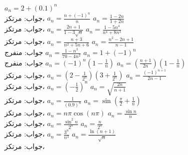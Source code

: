 $a_n=2+(0.1)^n$\\
جواب:\quad
مرتکز، 
$a_n=\frac{n+(-1)^n}{n}$
$a_n=\frac{1-2n}{1+2n}$\\
جواب:\quad
مرتکز، 
$a_n=\frac{2n+1}{1-3\sqrt{n}}$
$a_n=\frac{1-5n^4}{n^4+8n^3}$\\
جواب:\quad
مرتکز، 
$a_n=\frac{n+3}{n^2+5n+6}$
$a_n=\frac{n^2-2n+1}{n-1}$\\
جواب:\quad
منفرج
$a_n=\frac{1-n^3}{70-4n^2}$
$a_n=1+(-1)^n$\\
جواب:\quad
منفرج
$a_n=(-1)^n(1-\tfrac{1}{n})$
$a_n=(\tfrac{n+1}{2n})(1-\tfrac{1}{n})$\\
جواب:\quad
مرتکز، 
$a_n=(2-\tfrac{1}{2^n})(3+\tfrac{1}{2^n})$
$a_n=\frac{(-1)^{n+1}}{2n-1}$\\
جواب:\quad
مرتکز، 
$a_n=(-\tfrac{1}{2})^n$
$a_n=\sqrt{\frac{2n}{n+1}}$\\
جواب:\quad
مرتکز، 
$a_n=\frac{1}{(0.9)^n}$
$a_n=\sin(\tfrac{\pi}{2}+\tfrac{1}{n})$\\
جواب:\quad
مرتکز، 
$a_n=n\pi \cos (n\pi)$
$a_n=\frac{\sin n}{n}$\\
جواب:\quad
مرتکز، 
$a_n=\frac{\sin^2 n}{2^n}$
$a_n=\frac{n}{2^n}$\\
جواب:\quad
مرتکز، 
$a_n=\frac{3^n}{n^3}$
$a_n=\frac{\ln(n+1)}{\sqrt{n}}$\\
جواب:\quad
مرتکز، 
